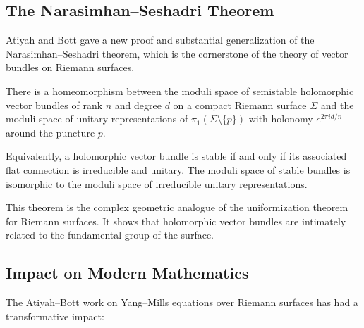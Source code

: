 \subsection{The Narasimhan--Seshadri Theorem}

Atiyah and Bott gave a new proof and substantial generalization of the Narasimhan--Seshadri theorem, which is the cornerstone of the theory of vector bundles on Riemann surfaces.

\begin{theorem}
There is a homeomorphism between the moduli space of semistable holomorphic vector bundles of rank \(n\) and degree \(d\) on a compact Riemann surface \(\Sigma\) and the moduli space of unitary representations of \(\pi_1(\Sigma \setminus \{p\})\) with holonomy \(e^{2\pi i d/n}\) around the puncture \(p\).

Equivalently, a holomorphic vector bundle is stable if and only if its associated flat connection is irreducible and unitary. The moduli space of stable bundles is isomorphic to the moduli space of irreducible unitary representations.
\end{theorem}

This theorem is the complex geometric analogue of the uniformization theorem for Riemann surfaces. It shows that holomorphic vector bundles are intimately related to the fundamental group of the surface.

\subsection{Impact on Modern Mathematics}

The Atiyah--Bott work on Yang--Mills equations over Riemann surfaces has had a transformative impact:

